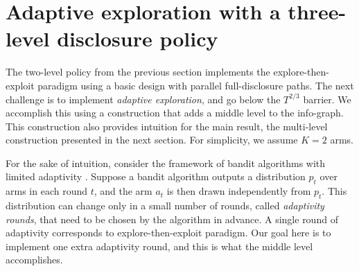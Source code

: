 
\section{Adaptive exploration with a three-level disclosure policy}
\label{sec:3level}

The two-level policy from the previous section implements the explore-then-exploit paradigm using a basic design with parallel full-disclosure paths. The next challenge is to implement \emph{adaptive exploration}, and go below the $T^{2/3}$ barrier. We accomplish this using a construction that adds a middle level to the info-graph. This construction also provides intuition for the main result, the multi-level construction presented in the next section. For simplicity, we assume $K=2$ arms.

For the sake of intuition, consider the framework of bandit algorithms with limited adaptivity \cite{Perchet2015BatchedBP}. Suppose a bandit algorithm outputs a distribution $p_t$ over arms in each round $t$, and the arm $a_t$ is then drawn independently from $p_t$. This distribution can change only in a small number of rounds, called \emph{adaptivity rounds}, that need to be chosen by the algorithm in advance. A single round of adaptivity corresponds to explore-then-exploit paradigm. Our goal here is to implement one extra adaptivity round, and this is what the middle level accomplishes.


